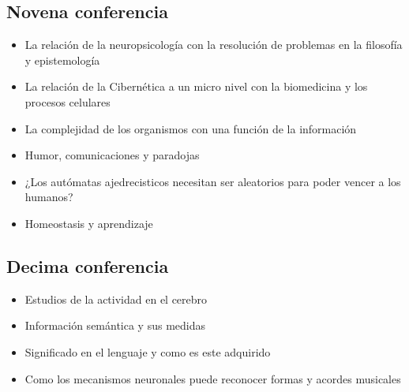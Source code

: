 \documentclass[a4paper, 12pt]{article}
\begin{document}
\subsection{Novena conferencia}
\begin{itemize}
 \item La relación de la neuropsicología con la resolución de problemas en la
filosofía y epistemología
\item La relación de la Cibernética a un micro nivel con la biomedicina y los
procesos celulares
\item La complejidad de los organismos con una función de la información
\item Humor, comunicaciones y paradojas
\item ¿Los autómatas ajedrecisticos necesitan ser aleatorios para poder vencer
a los humanos?
\item Homeostasis y aprendizaje
\end{itemize}
\subsection{Decima conferencia}
\begin{itemize}
 \item Estudios de la actividad en el cerebro
 \item Información semántica y sus medidas
 \item Significado en el lenguaje y como es este adquirido
 \item Como los mecanismos neuronales puede reconocer formas y acordes
musicales
\end{itemize}
 

\end{document}
